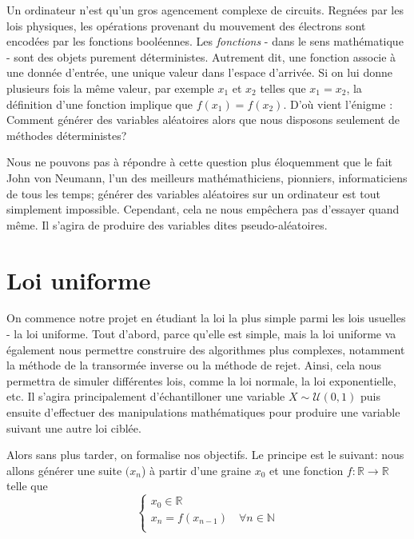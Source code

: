 \documentclass[10pt]{article} %
\begin{document}
Un ordinateur n'est qu'un gros agencement complexe de circuits. Regnées par les lois physiques, les opérations provenant du mouvement des électrons
sont encodées par les fonctions booléennes. Les \textit{fonctions} - dans le sens mathématique - sont des objets purement déterministes. Autrement dit,
une fonction associe à une donnée d'entrée, une unique valeur dans l'espace d'arrivée. Si on lui donne plusieurs fois la même valeur, par exemple $x_1$ et $x_2$
telles que $x_1 = x_2$, la définition d'une fonction implique que $f(x_1) = f(x_2)$. D'où vient l'énigme : Comment générer des variables aléatoires alors que nous
disposons seulement de méthodes déterministes?

Nous ne pouvons pas à répondre à cette question plus éloquemment que le fait John von Neumann, l'un des meilleurs mathémathiciens, pionniers, informaticiens de tous les temps; générer des variables aléatoires sur un ordinateur est tout simplement impossible.
Cependant, cela ne nous empêchera pas d'essayer quand même. Il s'agira de produire des variables dites pseudo-aléatoires.

\section{Loi uniforme}

On commence notre projet en étudiant la loi la plus simple parmi les lois usuelles - la loi uniforme. Tout d'abord, parce qu'elle est simple, mais la loi uniforme va également nous permettre construire des algorithmes plus complexes, notamment la méthode de la transormée inverse ou la méthode de rejet. Ainsi, cela nous permettra de simuler différentes lois, comme la loi normale, la loi exponentielle, etc. Il s'agira principalement d'échantilloner une variable $X\sim \mathcal{U}(0, 1)$ puis ensuite d'effectuer des manipulations mathématiques pour produire une variable suivant une autre loi ciblée.

Alors sans plus tarder, on formalise nos objectifs. Le principe est le suivant: nous allons générer une suite $(x_n$) à partir d'une graine $x_0$ et une fonction $f : \mathbb{R} \longrightarrow \mathbb{R}$ telle que
$$
\left\{
    \begin{array}{ll}
        x_{0} \in \mathbb{R} \\
        x_{n} = f(x_{n - 1})  \quad \forall n \in \mathbb{N} \\
    \end{array}
\right.
$$
\end{document}
